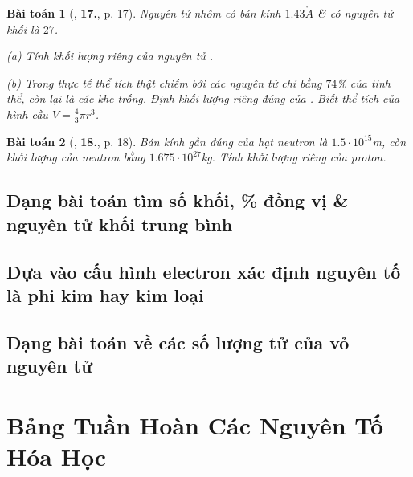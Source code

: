 \documentclass{article}
\numberwithin{equation}{section}
\newtheorem{baitoan}{Bài toán}[section]
\begin{document}
\begin{baitoan}[\cite{An2012}, \textbf{17.}, p. 17]
	Nguyên tử nhôm có bán kính $1.43\mathring{A}$ \& có nguyên tử khối là $27$.
	\begin{enumerate*}
		\item[(a)] Tính khối lượng riêng của nguyên tử \emph{}.
		\item[(b)] Trong thực tế thể tích thật chiếm bởi các nguyên tử chỉ bằng $74$\% của tinh thể, còn lại là các khe trống. Định khối lượng riêng đúng của \emph{}. Biết thể tích của hình cầu $V = \frac{4}{3}\pi r^3$.
	\end{enumerate*}
\end{baitoan}

\begin{baitoan}[\cite{An2012}, \textbf{18.}, p. 18]
	Bán kính gần đúng của hạt neutron là $1.5\cdot 10^{15}$\emph{m}, còn khối lượng của neutron bằng $1.675\cdot 10^{27}$\emph{kg}. Tính khối lượng riêng của proton.
\end{baitoan}


\subsection{Dạng bài toán tìm số khối, \% đồng vị \& nguyên tử khối trung bình}


\subsection{Dựa vào cấu hình electron xác định nguyên tố là phi kim hay kim loại}


\subsection{Dạng bài toán về các số lượng tử của vỏ nguyên tử}


\section{Bảng Tuần Hoàn Các Nguyên Tố Hóa Học}
\end{document}
